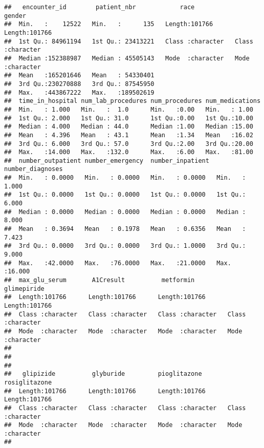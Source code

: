 \documentclass[
]{article}
\begin{document}
\begin{verbatim}
##   encounter_id        patient_nbr            race              gender         
##  Min.   :    12522   Min.   :      135   Length:101766      Length:101766     
##  1st Qu.: 84961194   1st Qu.: 23413221   Class :character   Class :character  
##  Median :152388987   Median : 45505143   Mode  :character   Mode  :character  
##  Mean   :165201646   Mean   : 54330401                                        
##  3rd Qu.:230270888   3rd Qu.: 87545950                                        
##  Max.   :443867222   Max.   :189502619                                        
##  time_in_hospital num_lab_procedures num_procedures num_medications
##  Min.   : 1.000   Min.   :  1.0      Min.   :0.00   Min.   : 1.00  
##  1st Qu.: 2.000   1st Qu.: 31.0      1st Qu.:0.00   1st Qu.:10.00  
##  Median : 4.000   Median : 44.0      Median :1.00   Median :15.00  
##  Mean   : 4.396   Mean   : 43.1      Mean   :1.34   Mean   :16.02  
##  3rd Qu.: 6.000   3rd Qu.: 57.0      3rd Qu.:2.00   3rd Qu.:20.00  
##  Max.   :14.000   Max.   :132.0      Max.   :6.00   Max.   :81.00  
##  number_outpatient number_emergency  number_inpatient  number_diagnoses
##  Min.   : 0.0000   Min.   : 0.0000   Min.   : 0.0000   Min.   : 1.000  
##  1st Qu.: 0.0000   1st Qu.: 0.0000   1st Qu.: 0.0000   1st Qu.: 6.000  
##  Median : 0.0000   Median : 0.0000   Median : 0.0000   Median : 8.000  
##  Mean   : 0.3694   Mean   : 0.1978   Mean   : 0.6356   Mean   : 7.423  
##  3rd Qu.: 0.0000   3rd Qu.: 0.0000   3rd Qu.: 1.0000   3rd Qu.: 9.000  
##  Max.   :42.0000   Max.   :76.0000   Max.   :21.0000   Max.   :16.000  
##  max_glu_serum       A1Cresult          metformin         glimepiride       
##  Length:101766      Length:101766      Length:101766      Length:101766     
##  Class :character   Class :character   Class :character   Class :character  
##  Mode  :character   Mode  :character   Mode  :character   Mode  :character  
##                                                                             
##                                                                             
##                                                                             
##   glipizide          glyburide         pioglitazone       rosiglitazone     
##  Length:101766      Length:101766      Length:101766      Length:101766     
##  Class :character   Class :character   Class :character   Class :character  
##  Mode  :character   Mode  :character   Mode  :character   Mode  :character  
##                                                                             

\end{verbatim}
\end{document}

